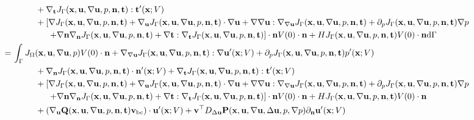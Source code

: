 \documentclass[oneside,11pt]{book}
\numberwithin{equation}{section}
\begin{document}
\begin{enumerate}[leftmargin=0in]
\begin{align*}
        &\hspace{1cm}+ \nabla_{\bf t}J_\Gamma({\bf x},{\bf u},\nabla{\bf u},p,{\bf n},{\bf t}):{\bf t}'({\bf x};V)\\
        &\hspace{1cm}+ \left[\nabla J_\Gamma({\bf x},{\bf u},\nabla{\bf u},p,{\bf n},{\bf t}) + \nabla_{\bf u}J_\Gamma({\bf x},{\bf u},\nabla{\bf u},p,{\bf n},{\bf t})\cdot\nabla{\bf u} + \nabla\nabla{\bf u}:\nabla_{\nabla{\bf u}}J_\Gamma({\bf x},{\bf u},\nabla{\bf u},p,{\bf n},{\bf t}) + \partial_pJ_\Gamma({\bf x},{\bf u},\nabla{\bf u},p,{\bf n},{\bf t})\nabla p\right.\\
        &\hspace{15mm} \left.+ \nabla{\bf n}\nabla_{\bf n}J_\Gamma({\bf x},{\bf u},\nabla{\bf u},p,{\bf n},{\bf t}) + \nabla{\bf t}:\nabla_{\bf t}J_\Gamma({\bf x},{\bf u},\nabla{\bf u},p,{\bf n},{\bf t})\right]\cdot{\bf n}V(0)\cdot{\bf n} + HJ_\Gamma({\bf x},{\bf u},\nabla{\bf u},p,{\bf n},{\bf t})V(0)\cdot{\bf n}{\rm d}\Gamma\\
        =&\, \int_\Gamma J_\Omega({\bf x},{\bf u},\nabla{\bf u},p)V(0)\cdot{\bf n} + \nabla_{\nabla{\bf u}}J_\Gamma({\bf x},{\bf u},\nabla{\bf u},p,{\bf n},{\bf t}):\nabla{\bf u}'({\bf x};V) + \partial_pJ_\Gamma({\bf x},{\bf u},\nabla{\bf u},p,{\bf n},{\bf t})p'({\bf x};V)\\
        &\hspace{1cm}+ \nabla_{\bf n}J_\Gamma({\bf x},{\bf u},\nabla{\bf u},p,{\bf n},{\bf t})\cdot{\bf n}'({\bf x};V) + \nabla_{\bf t}J_\Gamma({\bf x},{\bf u},\nabla{\bf u},p,{\bf n},{\bf t}):{\bf t}'({\bf x};V)\\
        &\hspace{1cm}+ \left[\nabla J_\Gamma({\bf x},{\bf u},\nabla{\bf u},p,{\bf n},{\bf t}) + \nabla_{\bf u}J_\Gamma({\bf x},{\bf u},\nabla{\bf u},p,{\bf n},{\bf t})\cdot\nabla{\bf u} + \nabla\nabla{\bf u}:\nabla_{\nabla{\bf u}}J_\Gamma({\bf x},{\bf u},\nabla{\bf u},p,{\bf n},{\bf t}) + \partial_pJ_\Gamma({\bf x},{\bf u},\nabla{\bf u},p,{\bf n},{\bf t})\nabla p\right.\\
        &\hspace{15mm} \left.+ \nabla{\bf n}\nabla_{\bf n}J_\Gamma({\bf x},{\bf u},\nabla{\bf u},p,{\bf n},{\bf t}) + \nabla{\bf t}:\nabla_{\bf t}J_\Gamma({\bf x},{\bf u},\nabla{\bf u},p,{\bf n},{\bf t})\right]\cdot{\bf n}V(0)\cdot{\bf n} + HJ_\Gamma({\bf x},{\bf u},\nabla{\bf u},p,{\bf n},{\bf t})V(0)\cdot{\bf n}\\
        &\hspace{1cm}+ (\nabla_{\bf u}{\bf Q}({\bf x},{\bf u},\nabla{\bf u},p,{\bf n},{\bf t}){\bf v}_{\rm bc})\cdot{\bf u}'({\bf x};V) + {\bf v}^\top D_{\Delta{\bf u}}{\bf P}({\bf x},{\bf u},\nabla{\bf u},\Delta{\bf u},p,\nabla p)\partial_{\bf n}{\bf u}'({\bf x};V)\\

\end{align*}
\end{enumerate}
\end{document}
